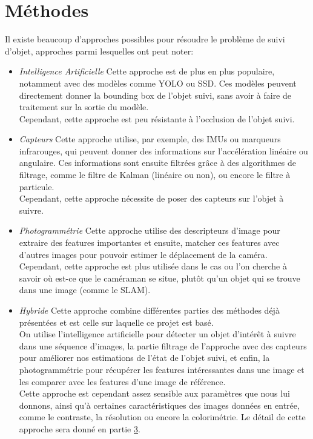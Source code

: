 \section{Méthodes}
Il existe beaucoup d'approches possibles pour résoudre le problème de suivi d'objet, approches parmi lesquelles ont peut noter:\\
\begin{itemize}
	\item \textit{Intelligence Artificielle}\newline
	Cette approche est de plus en plus populaire, notamment avec des modèles comme YOLO\cite{redmon_you_2016} ou SSD\cite{liu_ssd_2016}. Ces modèles peuvent directement donner la bounding box de l'objet suivi, sans avoir à faire de traitement sur la sortie du modèle.\\
	Cependant, cette approche est peu résistante à l'occlusion de l'objet suivi.\\
	
	\item \textit{Capteurs}\newline
	Cette approche utilise, par exemple, des IMUs ou marqueurs infrarouges, qui peuvent donner des informations sur l'accélération linéaire ou angulaire. Ces informations sont ensuite filtrées grâce à des algorithmes de filtrage, comme le filtre de Kalman (linéaire ou non), ou encore le filtre à particule.\\
	Cependant, cette approche nécessite de poser des capteurs sur l'objet à suivre.\\
	
	\item \textit{Photogrammétrie}\newline
	Cette approche utilise des descripteurs d'image pour extraire des features importantes et ensuite, matcher ces features avec d'autres images pour pouvoir estimer le déplacement de la caméra.\\
	Cependant, cette approche est plus utilisée dans le cas ou l'on cherche à savoir où est-ce que le caméraman se situe, plutôt qu'un objet qui se trouve dans une image (comme le SLAM).\\
	
	\item \textit{Hybride}\newline
	Cette approche combine différentes parties des méthodes déjà présentées et est celle sur laquelle ce projet est basé.\\
	On utilise l'intelligence artificielle pour détecter un objet d'intérêt à suivre dans une séquence d'images, la partie filtrage de l'approche avec des capteurs pour améliorer nos estimations de l'état de l'objet suivi, et enfin, la photogrammétrie pour récupérer les features intéressantes dans une image et les comparer avec les features d'une image de référence.\\
	Cette approche est cependant assez sensible aux paramètres que nous lui donnons, ainsi qu'à certaines caractéristiques des images données en entrée, comme le contraste, la résolution ou encore la colorimétrie.
	Le détail de cette approche sera donné en partie \hyperlink{chapter.3}{3}.\\
\end{itemize}
